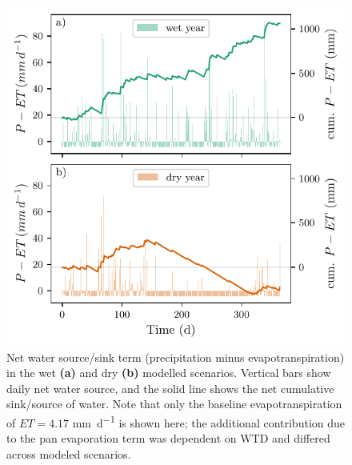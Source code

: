 \documentclass[bg, manuscript]{copernicus}
\begin{document}
\begin{figure}[t]
\includegraphics[width=8.3 cm]{figs/P_minus_ET.pdf}
\caption{Net water source/sink term (precipitation minus evapotranspiration) in the wet \textbf{(a)} and dry \textbf{(b)} modelled scenarios. Vertical bars show daily net water source, and the solid line shows the net cumulative sink/source of water.  Note that only the baseline evapotranspiration of $ET = 4.17$ \unit{mm d^{-1}} is shown here; the additional contribution due to the pan evaporation term was dependent on WTD and differed across modeled scenarios.}
\label{fig:p_minus_et}
\end{figure}   
\end{document}
